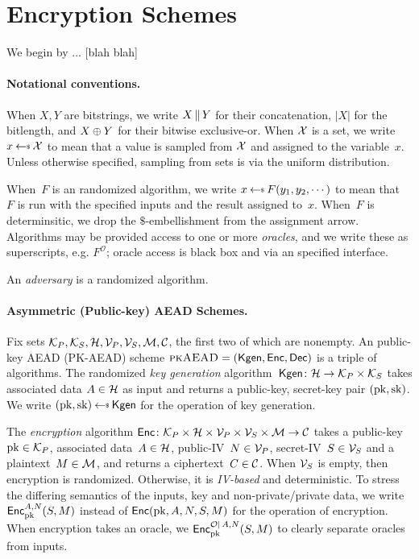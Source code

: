 \section{Encryption Schemes}
\label{sec:prelims}
\label{sec:encryption}
We begin by ... [blah blah]

\paragraph{Notational conventions. }When $X,Y$ are bitstrings, we write $X \concat Y$ for their concatenation, $|X|$ for the bitlength, and $X\xor Y$ for their bitwise exclusive-or.  When $\calX$ is a set, we write $x \getsr \calX$ to mean that a value is sampled from $\calX$ and assigned to the variable~$x$.  Unless otherwise specified, sampling from sets is via the uniform distribution.

When~$F$ is an randomized algorithm, we write $x \getsr F(y_1,y_2,\cdots)$ to mean that~$F$ is run with the specified inputs and the result assigned to~$x$.  When~$F$ is determinsitic, we drop the $\$$-embellishment from the assignment arrow.  Algorithms may be provided access to one or more \emph{oracles}, and we write these as superscripts, e.g. $F^{\mathcal{O}}$; oracle access is black box and via an specified interface.  

An \emph{adversary} is a randomized algorithm.

\paragraph{Asymmetric (Public-key) AEAD Schemes. }
Fix sets $\pubkeys, \seckeys, \adata, \pubivs, \secivs, \ptxts,
\ctxts$, the first two of which are nonempty.  An public-key AEAD
(PK-AEAD) scheme $\pkaead=(\Kgen,\Enc,\Dec)$ is a triple of algorithms.  The randomized \emph{key generation} algorithm~$\Kgen\colon\adata\to\pubkeys\times\seckeys$ takes associated data $\header \in \adata$ as input and returns a public-key, secret-key pair $(\pk,\sk)$.  We write $(\pk,\sk)\getsr\Kgen$ for the operation of key generation. 

The \emph{encryption} algorithm $\Enc \colon \pubkeys \times \adata \times \pubivs \times \secivs \times \ptxts \to \ctxts$ takes a public-key~$\pk\in\pubkeys$, associated data~$\header \in \adata$, public-IV~$\pubiv \in \pubivs$, secret-IV~$\seciv \in \secivs$ and a plaintext~$M \in \ptxts$, and returns a ciphertext~$C \in \ctxts$. 
When $\secivs$ is empty, then encryption is randomized.  Otherwise, it is \emph{IV-based} and deterministic.
To stress the differing semantics of the inputs, key and non-private/private data, we write $\Encprim{\pk}{\header,\pubiv}{S,M}$ instead of $\Enc(\pk,\header,\pubiv,\seciv,M)$ for the operation of encryption.  When encryption takes an oracle, we $\EncprimO{\pk}{\header,\pubiv}{\seciv,M}{\mathcal{O}}$ to clearly separate oracles from inputs.

